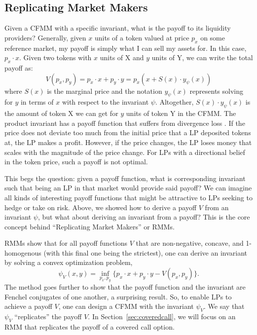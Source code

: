 \documentclass[hidelinks, 12pt]{article}
\begin{document}
\subsection{Replicating Market Makers}
\label{sec:rmm}

Given a CFMM with a specific invariant, what is the payoff to its liquidity providers? Generally, given $x$ units of a token valued at price $p_x$ on some reference market, my payoff is simply what I can sell my assets for. In this case,  $p_x \cdot x$. Given two tokens with $x$ units of X and $y$ units of Y, we can write the total payoff as:
\[V(p_x, p_y) = p_x\cdot x + p_y \cdot y = p_x (x + S(x)\cdot y_\psi(x))\]
where $S(x)$ is the marginal price and the notation $y_\psi(x)$ represents solving for $y$ in terms of $x$ with respect to the invariant $\psi$.
Altogether, $S(x)\cdot y_\psi(x)$ is the amount of token X we can get for $y$ units of token Y in the CFMM.
The product invariant has a payoff function that suffers from divergence loss \cite{angeris2019analysis}. If the price does not deviate too much from the initial price that a LP deposited tokens at, the LP makes a profit. However, if the price changes, the LP loses money that scales with the magnitude of the price change. For LPs with a directional belief in the token price, such a payoff is not optimal.

This begs the question: given a payoff function, what is corresponding invariant such that being an LP in that market would provide said payoff? We can imagine all kinds of interesting payoff functions that might be attractive to LPs seeking to hedge or take on risk.  Above, we showed how to derive a payoff $V$ from an invariant $\psi$, but what about deriving an invariant from a payoff? This is the core concept behind ``Replicating Market Makers'' or RMMs.

RMMs \cite{angeris2021replicating} show that for all payoff functions $V$ that are non-negative, concave, and 1-homogenous (with this final one being the strictest), one can derive an invariant by solving a convex optimization problem,
\[ \psi_V(x, y) = \inf_{p_x, p_y} \{ p_x \cdot x + p_y \cdot y - V(p_x, p_y) \}. \]
The method goes further to show that the payoff function and the invariant are Fenchel conjugates of one another, a surprising result. So, to enable LPs to achieve a payoff $V$, one can design a CFMM with the invariant $\psi_V$. We say that $\psi_V$ ``replicates'' the payoff $V$. In Section~\ref{sec:coveredcall}, we will focus on an RMM that replicates the payoff of a covered call option.
\end{document}
